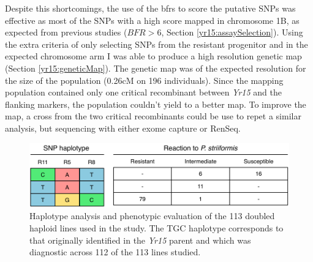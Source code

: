 Despite this shortcomings, the use of the \glspl{bfr} to score the putative SNPs was effective as most of the SNPs with a high score  mapped in chromosome 1B, as expected from previous studies ($BFR>6$, Section \ref{yr15:assaySelection}).
Using the extra criteria of only selecting SNPs from the resistant progenitor and in the expected chromosome arm I was able to produce a high resolution genetic map (Section \ref{yr15:geneticMap}). 
The genetic map was of the expected resolution for the size of the population (0.26cM on 196 individuals).
Since the mapping population contained only one critical recombinant between \textit{Yr15} and the flanking markers, the population couldn't yield to a better map. 
To improve the map, a cross from the two critical recombinants could be use to repet a similar analysis, but sequencing with either exome capture or RenSeq. 

\begin{figure}
\includegraphics[width=1\textwidth]{Yr15/Figures/breedersTest.pdf}
\caption{Haplotype analysis and phenotypic evaluation of the 113 doubled haploid lines used in the study. The TGC haplotype corresponds to that originally identified in the \textit{Yr15} parent and which was diagnostic across 112 of the 113 lines studied.}
\label{fig:yr15:breeders}
\end{figure}

